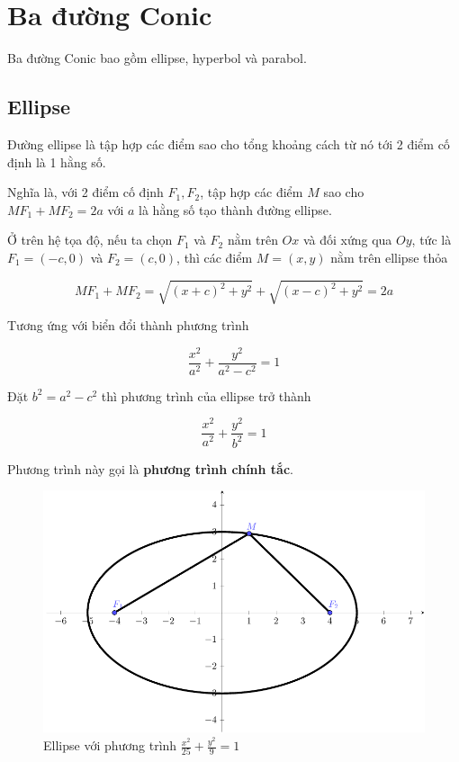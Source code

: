 \chapter{Ba đường Conic}

Ba đường Conic bao gồm ellipse, hyperbol và parabol.

\section{Ellipse}

\begin{definition}[Ellipse]
    Đường ellipse là tập hợp các điểm sao cho tổng khoảng cách từ nó tới 2 điểm cố định là 1 hằng số.
\end{definition}

Nghĩa là, với 2 điểm cố định $F_1, F_2$, tập hợp các điểm $M$ sao cho $M F_1 + M F_2 = 2a$ với $a$ là hằng số tạo thành đường ellipse.

Ở trên hệ tọa độ, nếu ta chọn $F_1$ và $F_2$ nằm trên $Ox$ và đối xứng qua $Oy$, tức là $F_1 = (-c, 0)$ và $F_2 = (c, 0)$, thì các điểm $M = (x, y)$ nằm trên ellipse thỏa

$$MF_1 + MF_2 = \sqrt{(x+c)^2 + y^2} + \sqrt{(x-c)^2 + y^2} = 2a$$

Tương ứng với biển đổi thành phương trình

$$\frac{x^2}{a^2} + \frac{y^2}{a^2 - c^2} = 1$$

Đặt $b^2 = a^2 - c^2$ thì phương trình của ellipse trở thành

$$\frac{x^2}{a^2} + \frac{y^2}{b^2} = 1$$

Phương trình này gọi là \textbf{phương trình chính tắc}.

\begin{figure}[ht]
    \centering
    \includegraphics[width=\textwidth]{../pics/conics/ellipse.pdf}
    \caption{Ellipse với phương trình $\frac{x^2}{25} + \frac{y^2}{9} = 1$}
\end{figure}

